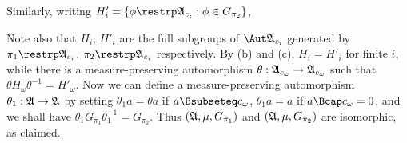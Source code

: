 {
     
\noindent Similarly, writing
$H'_i=\{\phi\restrp\frak A_{c_i}:\phi\in G_{\pi_2}\}$,
     
     
\noindent Note also that $H_i$, $H'_i$ are the full subgroups of
$\Aut\frak A_{c_i}$ generated by $\pi_1\restrp\frak A_{c_i}$,
$\pi_2\restrp\frak A_{c_i}$ respectively.   By (b) and (c), $H_i=H'_i$
for finite $i$, while there is a measure-preserving automorphism
$\theta:\frak A_{c_{\omega}}\to\frak A_{c_{\omega}}$ such that
$\theta H_{\omega}\theta^{-1}=H'_{\omega}$.   Now we can define a
measure-preserving automorphism $\theta_1:\frak A\to\frak A$ by setting
$\theta_1a=\theta a$ if $a\Bsubseteq c_{\omega}$, $\theta_1a=a$ if
$a\Bcap c_{\omega}=0$, and we shall have
$\theta_1G_{\pi_1}\theta_1^{-1}=G_{\pi_2}$.   Thus
$(\frak A,\bar\mu,G_{\pi_1})$ and $(\frak A,\bar\mu,G_{\pi_2})$ are
isomorphic,
as claimed.
}%
     

